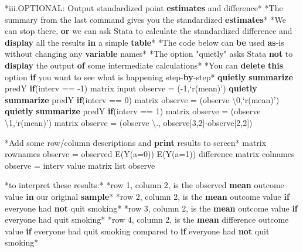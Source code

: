 \documentclass[
  10pt,
]{book}
\newenvironment{Shaded}{\begin{snugshade}}{\end{snugshade}}
\newcommand{\FunctionTok}[1]{\textcolor[rgb]{0.00,0.00,0.00}{#1}}
\newcommand{\KeywordTok}[1]{\textcolor[rgb]{0.13,0.29,0.53}{\textbf{#1}}}
\newcommand{\NormalTok}[1]{#1}
\newcommand{\OtherTok}[1]{\textcolor[rgb]{0.56,0.35,0.01}{#1}}
\newcommand{\StringTok}[1]{\textcolor[rgb]{0.31,0.60,0.02}{#1}}
\begin{document}
\begin{Shaded}
\begin{Highlighting}[]
\NormalTok{*iii.OPTIONAL: Output standardized point }\KeywordTok{estimates}\NormalTok{ and difference*}
\NormalTok{*The summary from the }\FunctionTok{last}\NormalTok{ command gives you the standardized }\KeywordTok{estimates}\NormalTok{*}
\NormalTok{*We can stop there, }\KeywordTok{or}\NormalTok{ we can ask Stata to calculate the standardized difference and }\KeywordTok{display} \OtherTok{all}\NormalTok{ the results }\KeywordTok{in}\NormalTok{ a simple }\KeywordTok{table}\NormalTok{*}
\NormalTok{*The code below can }\KeywordTok{be}\NormalTok{ used }\KeywordTok{as}\NormalTok{-is without changing any }\KeywordTok{variable}\NormalTok{ names*}
\NormalTok{*The option }\StringTok{"quietly"}\NormalTok{ asks Stata }\KeywordTok{not}\NormalTok{ to }\KeywordTok{display}\NormalTok{ the output }\KeywordTok{of}\NormalTok{ some intermediate calculations*}
\NormalTok{*You can }\KeywordTok{delete} \KeywordTok{this}\NormalTok{ option }\KeywordTok{if}\NormalTok{ you want to see what is happening step-}\KeywordTok{by}\NormalTok{-step*}
\KeywordTok{quietly} \KeywordTok{summarize}\NormalTok{ predY }\KeywordTok{if}\NormalTok{(interv == -1)}
\FunctionTok{matrix}\NormalTok{ input observe = (-1,}\OtherTok{`r(mean)'}\NormalTok{)}
\KeywordTok{quietly} \KeywordTok{summarize}\NormalTok{ predY }\KeywordTok{if}\NormalTok{(interv == 0)}
\FunctionTok{matrix}\NormalTok{ observe = (observe \textbackslash{}0,}\OtherTok{`r(mean)'}\NormalTok{)}
\KeywordTok{quietly} \KeywordTok{summarize}\NormalTok{ predY }\KeywordTok{if}\NormalTok{(interv == 1)}
\FunctionTok{matrix}\NormalTok{ observe = (observe \textbackslash{}1,}\OtherTok{`r(mean)'}\NormalTok{)}
\FunctionTok{matrix}\NormalTok{ observe = (observe \textbackslash{}., observe[3,2]-observe[2,2]) }

\NormalTok{*Add some }\OtherTok{row}\NormalTok{/column descriptions and }\KeywordTok{print}\NormalTok{ results to screen*}
\FunctionTok{matrix} \OtherTok{rownames}\NormalTok{ observe = observed E(Y(a=0)) E(Y(a=1)) difference}
\FunctionTok{matrix} \OtherTok{colnames}\NormalTok{ observe = interv }\OtherTok{value}
\FunctionTok{matrix} \OtherTok{list}\NormalTok{ observe }

\NormalTok{*to interpret these results:*}
\NormalTok{*}\OtherTok{row}\NormalTok{ 1, column 2, is the observed }\KeywordTok{mean}\NormalTok{ outcome }\OtherTok{value} \KeywordTok{in}\NormalTok{ our original }\KeywordTok{sample}\NormalTok{*}
\NormalTok{*}\OtherTok{row}\NormalTok{ 2, column 2, is the }\KeywordTok{mean}\NormalTok{ outcome }\OtherTok{value} \KeywordTok{if}\NormalTok{ everyone had }\KeywordTok{not}\NormalTok{ quit smoking*}
\NormalTok{*}\OtherTok{row}\NormalTok{ 3, column 2, is the }\KeywordTok{mean}\NormalTok{ outcome }\OtherTok{value} \KeywordTok{if}\NormalTok{ everyone had quit smoking*}
\NormalTok{*}\OtherTok{row}\NormalTok{ 4, column 2, is the }\KeywordTok{mean}\NormalTok{ difference outcome }\OtherTok{value} \KeywordTok{if}\NormalTok{ everyone had quit smoking compared to }\KeywordTok{if}\NormalTok{ everyone had }\KeywordTok{not}\NormalTok{ quit smoking*}
\end{Highlighting}
\end{Shaded}
\end{document}
